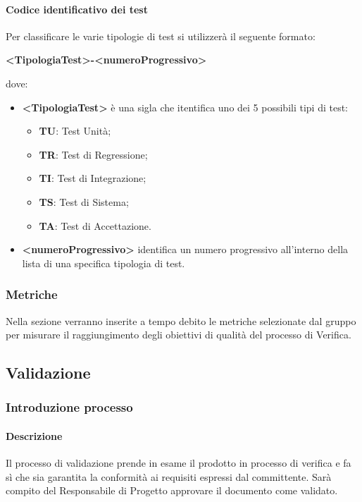                 \paragraph{Codice identificativo dei test}
                    Per classificare le varie tipologie di test si utilizzerà il seguente formato:
                    \begin{center}
                        \textbf{<TipologiaTest>-<numeroProgressivo>}
                    \end{center}
                    dove:
                    \begin{itemize}
                        \item\textbf{<TipologiaTest> } è una sigla che itentifica uno dei 5 possibili tipi di test:
                            \begin{itemize}
                                \item\textbf{TU}: Test Unità;
                                \item\textbf{TR}: Test di Regressione;
                                \item\textbf{TI}: Test di Integrazione;
                                \item\textbf{TS}: Test di Sistema;
                                \item\textbf{TA}: Test di Accettazione.
                            \end{itemize}
                        \item\textbf{<numeroProgressivo>} identifica un numero progressivo all’interno della lista di una specifica tipologia di test.
                    \end{itemize}
        \subsubsection{Metriche}
            Nella sezione verranno inserite a tempo debito le metriche selezionate dal gruppo per misurare il raggiungimento degli obiettivi di qualità del processo di Verifica.

    \subsection{Validazione}
        \subsubsection{Introduzione processo}
            \paragraph{Descrizione}
                Il processo di validazione prende in esame il prodotto in processo di verifica e fa sì che sia garantita la conformità ai requisiti espressi dal committente. Sarà compito del Responsabile di Progetto approvare il documento come validato.
